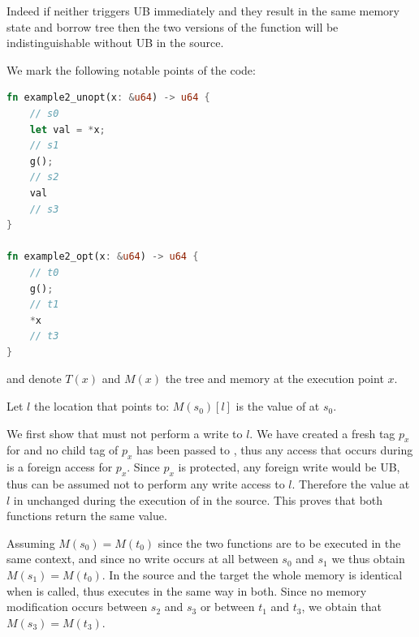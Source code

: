 \documentclass[a4paper,11pt]{article}
\theoremstyle{plain}
\theoremstyle{definition}
\theoremstyle{remark}
\newcommand{\tcode}[1]{\rstinline{#1}}
\begin{document}
Indeed if neither triggers UB immediately and they result in the same memory
state and borrow tree then the two versions of the function will be indistinguishable
without UB in the source.

We mark the following notable points of the code:
\begin{lstlisting}[language=rust]
fn example2_unopt(x: &u64) -> u64 {
    // s0
    let val = *x;
    // s1
    g();
    // s2
    val
    // s3
}

fn example2_opt(x: &u64) -> u64 {
    // t0
    g();
    // t1
    *x
    // t3
}
\end{lstlisting}
and denote \(T(x)\) and \(M(x)\) the tree and memory at the execution point \(x\).

Let \(l\) the location that \tcode{x} points to: \(M(s_0)[l]\) is the value
of \tcode{*x} at \(s_0\).

We first show that \tcode{g} must not perform a write to \(l\). We have created
a fresh tag \(p_x\) for \tcode{x} and no child tag of \(p_x\) has been passed
to \tcode{g}, thus any access that occurs during \tcode{g} is a foreign access
for \(p_x\). Since \(p_x\) is protected, any foreign write would be UB, thus
\tcode{g} can be assumed not to perform any write access to \(l\).
Therefore the value at \(l\) in unchanged during the execution of \tcode{g} in
the source. This proves that both functions return the same value.

Assuming \(M(s_0) = M(t_0)\) since the two functions are to be executed in the
same context, and since no write occurs at all between \(s_0\) and \(s_1\)
we thus obtain \(M(s_1) = M(t_0)\). In the source and the target the whole memory
is identical when \tcode{g} is called, thus \tcode{g} executes in the same way
in both. Since no memory modification occurs between \(s_2\) and \(s_3\) or between
\(t_1\) and \(t_3\), we obtain that \(M(s_3) = M(t_3)\).
\end{document}
